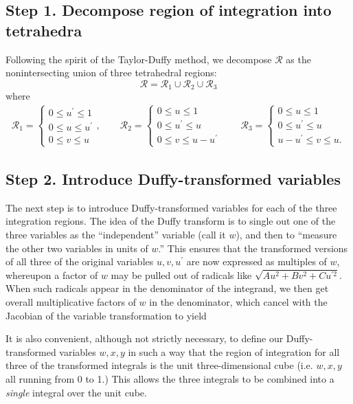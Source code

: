 \documentclass[letterpaper]{article}
\begin{document}
\subsection*{Step 1. Decompose region of integration into tetrahedra}

Following the spirit of the Taylor-Duffy method, we 
decompose $\mathcal{R}$ as the nonintersecting union 
of three tetrahedral regions:
$$ \mathcal{R} = \mathcal{R}_1 \cup
                 \mathcal{R}_2 \cup
                 \mathcal{R}_3
$$
where 
\begin{align*}
  \mathcal{R}_1 = 
  \begin{cases}
  0 \le u^\prime \le 1 \\
  0 \le u \le u^\prime \\
  0 \le v \le u
  \end{cases},
\qquad
  \mathcal{R}_2 = 
  \begin{cases}
  0 \le u \le 1 \\
  0 \le u^\prime \le u \\
  0 \le v \le u-u^\prime
  \end{cases}
\qquad
  \mathcal{R}_3 = 
  \begin{cases}
  0 \le u \le 1 \\
  0 \le u^\prime \le u \\
  u-u^\prime \le v \le u.
  \end{cases}
\end{align*}

\subsection*{Step 2. Introduce Duffy-transformed variables} 

The next step is to introduce Duffy-transformed variables for each 
of the three integration regions. The idea of the Duffy transform
is to single out one of the three variables as the ``independent''
variable (call it $w$), and then to ``measure the other two variables
in units of $w$.'' This ensures that the transformed versions of 
all three of the original variables $u,v,u^\prime$ are now expressed
as multiples of $w$, whereupon a factor of $w$ may be pulled out 
of radicals like $\sqrt{Au^2 + Bv^2 + Cu^{\prime 2}}$. When such radicals
appear in the denominator of the integrand, we then get overall 
multiplicative factors of $w$ in the denominator, which cancel with
the Jacobian of the variable transformation to yield 

It is also convenient, although not strictly necessary, to define our
Duffy-transformed variables $w,x,y$ in such a way that the region of
integration for all three of the transformed integrals is the unit
three-dimensional cube (i.e. $w,x,y$ all running from 0 to 1.) This 
allows the three integrals to be combined into a \textit{single} integral 
over the unit cube.
\end{document}
